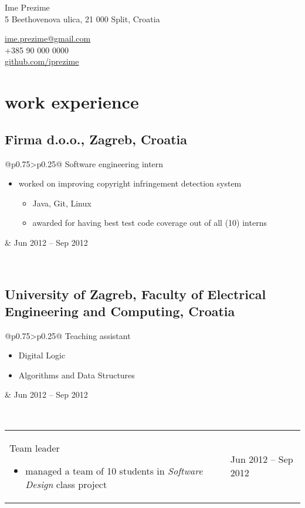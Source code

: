 \documentclass[a4paper]{article}
\makeatletter
\newlength{\tablewidth}
\newenvironment{period}[2]{%
\newcommand{\sarma}{#2}%
\setlength{\tablewidth}{\linewidth}
\addtolength{\tablewidth}{-2\tabcolsep}
\begin{tabular}{@{}p{0.75\tablewidth}>{\raggedleft\arraybackslash}p{0.25\tablewidth}@{}}%
#1 \newline
\begin{itemize}
}{%
\end{itemize} & \sarma \\%
\end{tabular}\\
}
\makeatother
\begin{document}
\fontfamily{\sfdefault}
\selectfont

\begin{minipage}{.5\textwidth}
\LARGE{Ime Prezime}\\
\normalsize{5 Beethovenova ulica, 21 000 Split, Croatia}
\end{minipage}%
\begin{minipage}{.5\textwidth}
\raggedleft
\href{mailto:ime.prezime@gmail.com}{ime.prezime@gmail.com} \\
+385 90 000 0000 \\
\href{https://github.com/iprezime}{github.com/iprezime}
\end{minipage}

\vspace{1em}

\section{work experience}
\subsection{Firma d.o.o., Zagreb, Croatia}
\begin{period}{Software engineering intern}{Jun 2012 -- Sep 2012}
    \item 
        worked on improving copyright infringement detection system
        \begin{itemize}
            \item Java, Git, Linux
            \item awarded for having best test code coverage out of all (10) interns
        \end{itemize}
\end{period}
\subsection{University of Zagreb, Faculty of Electrical Engineering and Computing, Croatia}
\begin{period}{Teaching assistant}{Oct 2008 -- May 2009}
    \item Digital Logic
    \item Algorithms and Data Structures
\end{period}
\begin{period}{Team leader}{Sep 2011 -- Jan 2012}
    \item managed a team of 10 students in \textit{Software Design} class project
\end{period}
\end{document}
